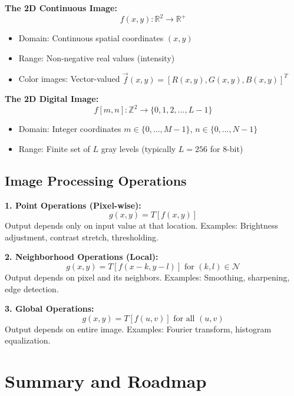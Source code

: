 \documentclass[12pt,a4paper]{article}
\begin{document}
\begin{mathbox}
\textbf{The 2D Continuous Image:}
\[
f(x, y) : \mathbb{R}^2 \rightarrow \mathbb{R}^+
\]
\begin{itemize}
    \item Domain: Continuous spatial coordinates $(x, y)$
    \item Range: Non-negative real values (intensity)
    \item Color images: Vector-valued $\vec{f}(x,y) = [R(x,y), G(x,y), B(x,y)]^T$
\end{itemize}

\textbf{The 2D Digital Image:}
\[
f[m, n] : \mathbb{Z}^2 \rightarrow \{0, 1, 2, \ldots, L-1\}
\]
\begin{itemize}
    \item Domain: Integer coordinates $m \in \{0, \ldots, M-1\}$, $n \in \{0, \ldots, N-1\}$
    \item Range: Finite set of $L$ gray levels (typically $L = 256$ for 8-bit)
\end{itemize}
\end{mathbox}

\subsection{Image Processing Operations}

\begin{conceptbox}
\textbf{1. Point Operations (Pixel-wise):}
\[
g(x, y) = T[f(x, y)]
\]
Output depends only on input value at that location.
Examples: Brightness adjustment, contrast stretch, thresholding.

\textbf{2. Neighborhood Operations (Local):}
\[
g(x, y) = T[f(x-k, y-l)] \text{ for } (k, l) \in \mathcal{N}
\]
Output depends on pixel and its neighbors.
Examples: Smoothing, sharpening, edge detection.

\textbf{3. Global Operations:}
\[
g(x, y) = T[f(u, v)] \text{ for all } (u, v)
\]
Output depends on entire image.
Examples: Fourier transform, histogram equalization.
\end{conceptbox}

\section{Summary and Roadmap}
\end{document}
